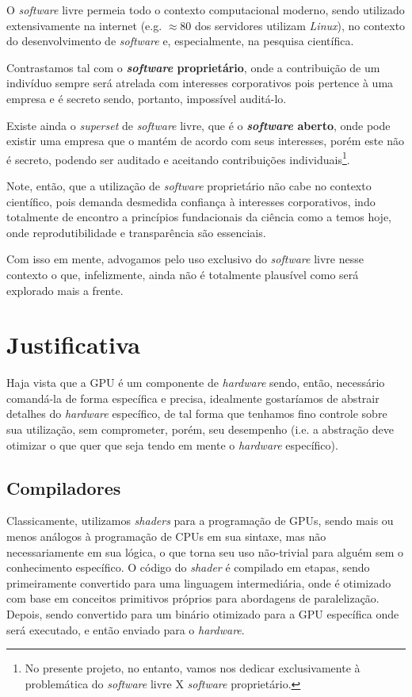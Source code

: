 \documentclass[10pt, a4paper, draftcls, conference, onecolumn]{IEEEtran}
\begin{document}
O \textit{software} livre permeia todo o contexto computacional moderno, sendo
utilizado extensivamente na internet (e.g. $\approx 80$ dos servidores utilizam
\textit{Linux}), no contexto do desenvolvimento de \textit{software} e,
especialmente, na pesquisa científica.

Contrastamos tal com o \textbf{\textit{software} proprietário}, onde a
contribuição de um indivíduo sempre será atrelada com interesses corporativos
pois pertence à uma empresa e é secreto sendo, portanto, impossível auditá-lo.

Existe ainda o \textit{superset} de \textit{software} livre, que é o
\textbf{\textit{software} aberto}, onde pode existir uma empresa que o mantém
de acordo com seus interesses, porém este não é secreto, podendo ser auditado e
aceitando contribuições individuais\footnote{ No presente projeto, no entanto,
vamos nos dedicar exclusivamente à problemática do \textit{software} livre X
\textit{software} proprietário. }.

Note, então, que a utilização de \textit{software} proprietário não cabe no
contexto científico, pois demanda desmedida confiança à interesses
corporativos, indo totalmente de encontro a princípios fundacionais da ciência
como a temos hoje, onde reprodutibilidade e transparência são essenciais.

Com isso em mente, advogamos pelo uso exclusivo do \textit{software} livre
nesse contexto o que, infelizmente, ainda não é totalmente plausível como será
explorado mais a frente.

\section{Justificativa}

Haja vista que a GPU é um componente de \textit{hardware} sendo, então,
necessário comandá-la de forma específica e precisa, idealmente gostaríamos de
abstrair detalhes do \textit{hardware} específico, de tal forma que tenhamos
fino controle sobre sua utilização, sem comprometer, porém, seu desempenho
(i.e. a abstração deve otimizar o que quer que seja tendo em mente o
\textit{hardware} específico).

\subsection{Compiladores}

Classicamente, utilizamos \textit{shaders} para a programação de GPUs, sendo
mais ou menos análogos à programação de CPUs em sua sintaxe, mas não
necessariamente em sua lógica, o que torna seu uso não-trivial para alguém sem
o conhecimento específico. O código do \textit{shader} é compilado em
etapas, sendo primeiramente convertido para uma linguagem intermediária, onde é
otimizado com base em conceitos primitivos próprios para abordagens de
paralelização. Depois, sendo convertido para um binário otimizado para a GPU
específica onde será executado, e então enviado para o \textit{hardware}.
\end{document}
